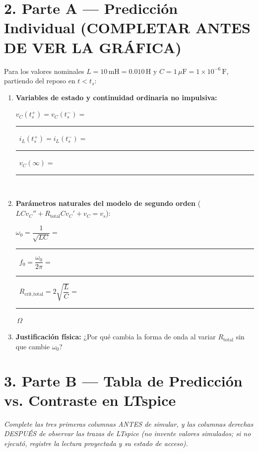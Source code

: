 \documentclass[11pt, a4paper]{article}
\begin{document}
\section*{2. Parte A — Predicción Individual (COMPLETAR ANTES DE VER LA GRÁFICA)}
Para los valores nominales $L = 10\,\text{mH} = 0.010\,\text{H}$ y $C = 1\,\mu\text{F} = 1\times 10^{-6}\,\text{F}$, partiendo del reposo en $t < t_s$:

\begin{enumerate}\setlength\itemsep{0.35cm}
    \item \textbf{Variables de estado y continuidad ordinaria no impulsiva:} \par\vspace{0.1cm}
    $v_C(t_s^+) = v_C(t_s^-) =$ \rule{2.0cm}{0.4pt}\, \hfill $i_L(t_s^+) = i_L(t_s^-) =$ \rule{2.0cm}{0.4pt}\, \hfill $v_C(\infty) =$ \rule{2.0cm}{0.4pt}\,
    
    \item \textbf{Parámetros naturales del modelo de segundo orden} ($LC v_C'' + R_{\text{total}}C v_C' + v_C = v_s$): \par\vspace{0.1cm}
    $\omega_0 = \dfrac{1}{\sqrt{LC}} =$ \rule{2.0cm}{0.4pt}\, \hfill $f_0 = \dfrac{\omega_0}{2\pi} =$ \rule{2.0cm}{0.4pt}\, \hfill $R_{\text{crit,total}} = 2\sqrt{\dfrac{L}{C}} =$ \rule{1.8cm}{0.4pt}\,$\Omega$

    \item \textbf{Justificación física:} ¿Por qué cambia la forma de onda al variar $R_{\text{total}}$ sin que cambie $\omega_0$? \par\vspace{0.15cm}
    \noindent\hrulefill
\end{enumerate}

\vspace{0.2cm}
\section*{3. Parte B — Tabla de Predicción vs. Contraste en LTspice}
\textit{Complete las tres primeras columnas ANTES de simular, y las columnas derechas DESPUÉS de observar las trazas de LTspice (no invente valores simulados; si no ejecutó, registre la lectura proyectada y su estado de acceso).}
\end{document}
